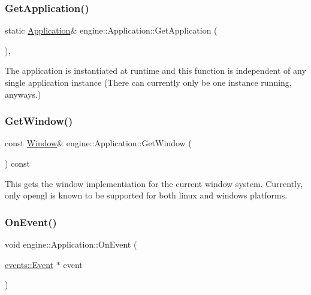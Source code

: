\subsubsection{\texorpdfstring{Get\+Application()}{GetApplication()}}
{\footnotesize\ttfamily static \hyperlink{classengine_1_1Application}{Application}\& engine\+::\+Application\+::\+Get\+Application (\begin{DoxyParamCaption}{ }\end{DoxyParamCaption})\hspace{0.3cm}{\ttfamily [inline]}, {\ttfamily [static]}}

The application is instantiated at runtime and this function is independent of any single application instance (There can currently only be one instance running, anyways.) \mbox{\label{classengine_1_1Application_a0c66a3ff294bcc497bb2e8eb7330124c}} 
\subsubsection{\texorpdfstring{Get\+Window()}{GetWindow()}}
{\footnotesize\ttfamily const \hyperlink{classengine_1_1Window}{Window}\& engine\+::\+Application\+::\+Get\+Window (\begin{DoxyParamCaption}{ }\end{DoxyParamCaption}) const\hspace{0.3cm}{\ttfamily [inline]}}

This gets the window implementiation for the current window system. Currently, only opengl is known to be supported for both linux and windows platforms. \mbox{\label{classengine_1_1Application_a093e14152fc1eda1b5eba682a2b4afd9}} 
\subsubsection{\texorpdfstring{On\+Event()}{OnEvent()}}
{\footnotesize\ttfamily void engine\+::\+Application\+::\+On\+Event (\begin{DoxyParamCaption}\item[{\hyperlink{classengine_1_1events_1_1Event}{events\+::\+Event} $\ast$}]{event }\end{DoxyParamCaption})}



